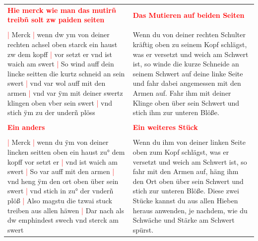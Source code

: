 \begin{longtable}{p{6.25cm}p{6.25cm}}
    \textbf{\textcolor{red}{
        Hie merck wie man das mutirñ treibñ solt zw paiden seiten}}
    &
    \textbf{\textcolor{red}{
        Das Mutieren auf beiden Seiten}}
    \\
    \\
    \textcolor{red}{|} Merck
    \textcolor{red}{|} wenn dw ym von deiner rechten achsel oben starck ein haust zw dem kopff
    \textcolor{red}{|} vor setzt er vnd ist waich am swert
    \textcolor{red}{|} So wind auff dein lincke seitten die kurtz schneid an sein swert
    \textcolor{red}{|} vnd var wol auff mit den armen
    \textcolor{red}{|} vnd var ÿm mit deiner swertz klingen oben vber sein swert
    \textcolor{red}{|} vnd stich ÿm zu der underñ plöss
    &
    Wenn du von deiner rechten Schulter kräftig oben zu seinem Kopf schlägst, was er versetzt und weich am Schwert ist, so winde die kurze Schneide an seinem Schwert auf deine linke Seite und fahr dabei angemessen mit den Armen auf.
    Fahr ihm mit deiner Klinge oben über sein Schwert und stich ihm zur unteren Blöße.
    \\
    \\
    \textbf{\textcolor{red}{
        Ein anders}}
    &
    \textbf{\textcolor{red}{
        Ein weiteres Stück}}
    \\
    \\
    \textcolor{red}{|} Merck
    \textcolor{red}{|} wenn du ÿm von deiner lincken seitten oben ein haust zu° dem kopff vor setzt er
    \textcolor{red}{|} vnd ist waich am swert
    \textcolor{red}{|} So var auff mit den armen
    \textcolor{red}{|} vnd heng ÿm den ort oben über sein swert
    \textcolor{red}{|} vnd stich in zu° der vnderñ plöß
    \textcolor{red}{|} Also magstu die tzwai stuck treiben aus allen häwen
    \textcolor{red}{|} Dar nach als dw emphindest swech vnd sterck am swert
    &
    Wenn du ihm von deiner linken Seite oben zum Kopf schlägst, was er versetzt und weich am Schwert ist, so fahr mit den Armen auf, häng ihm den Ort oben über sein Schwert und stich zur unteren Blöße.
    Diese zwei Stücke kannst du aus allen Hieben heraus anwenden, je nachdem, wie du Schwäche und Stärke am Schwert spürst.
\end{longtable}

\newpage

\begin{center}
\end{center}

